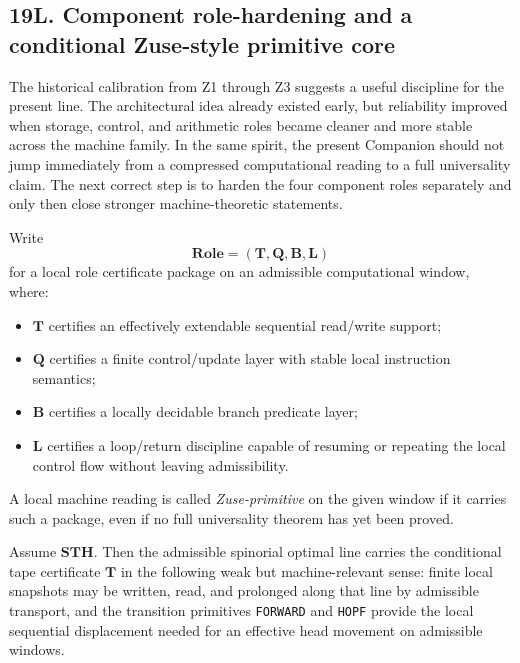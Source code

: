 \subsection*{19L. Component role-hardening and a conditional Zuse-style primitive core}
The historical calibration from Z1 through Z3 suggests a useful discipline for the present line. The architectural idea already existed early, but reliability improved when storage, control, and arithmetic roles became cleaner and more stable across the machine family. In the same spirit, the present Companion should not jump immediately from a compressed computational reading to a full universality claim. The next correct step is to harden the four component roles separately and only then close stronger machine-theoretic statements.

\begin{definition}
Write
\[
\mathbf{Role}=(\mathbf T,\mathbf Q,\mathbf B,\mathbf L)
\]
for a local role certificate package on an admissible computational window, where:
\begin{itemize}[leftmargin=2em]
  \item $\mathbf T$ certifies an effectively extendable sequential read/write support;
  \item $\mathbf Q$ certifies a finite control/update layer with stable local instruction semantics;
  \item $\mathbf B$ certifies a locally decidable branch predicate layer;
  \item $\mathbf L$ certifies a loop/return discipline capable of resuming or repeating the local control flow without leaving admissibility.
\end{itemize}
A local machine reading is called \emph{Zuse-primitive} on the given window if it carries such a package, even if no full universality theorem has yet been proved.
\end{definition}

\begin{proposition}
Assume $\mathbf{STH}$. Then the admissible spinorial optimal line carries the conditional tape certificate $\mathbf T$ in the following weak but machine-relevant sense: finite local snapshots may be written, read, and prolonged along that line by admissible transport, and the transition primitives \texttt{FORWARD} and \texttt{HOPF} provide the local sequential displacement needed for an effective head movement on admissible windows.
\end{proposition}

